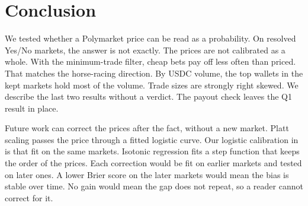 \section{Conclusion}\label{sec:conclusion}
We tested whether a Polymarket price can be read as a probability.
On \NMarketsKept{} resolved Yes/No markets, the answer is not exactly.
The prices are not calibrated as a whole.
With the minimum-trade filter, cheap bets pay off less often than priced.
That matches the horse-racing direction.
By USDC volume, the top wallets in the kept markets hold most of the volume.
Trade sizes are strongly right skewed.
We describe the last two results without a verdict.
The payout check leaves the Q1 result in place.

Future work can correct the prices after the fact, without a new market.
Platt scaling passes the price through a fitted logistic curve.
Our logistic calibration in  is that fit on the same markets.
Isotonic regression fits a step function that keeps the order of the prices.
Each correction would be fit on earlier markets and tested on later ones.
A lower Brier score on the later markets would mean the bias is stable over time.
No gain would mean the gap does not repeat, so a reader cannot correct for it.
